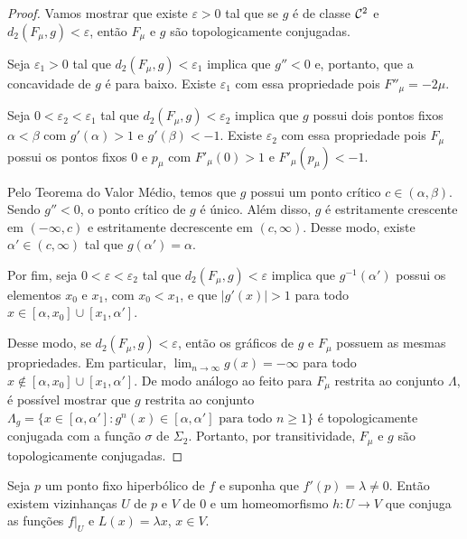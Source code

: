 \begin{proof}
Vamos mostrar que existe $\varepsilon > 0$ tal que se $g$ é de classe $\mathcal{C}^2$ e $d_2(F_\mu, g) < \varepsilon$, então $F_\mu$ e $g$ são topologicamente conjugadas.

Seja $\varepsilon_1 > 0$ tal que $d_2(F_\mu, g) < \varepsilon_1$ implica que $g'' < 0$ e, portanto, que a concavidade de $g$ é para baixo. Existe $\varepsilon_1$ com essa propriedade pois $F''_\mu = -2\mu$. 

Seja $0 < \varepsilon_2 < \varepsilon_1$ tal que $d_2(F_\mu, g) < \varepsilon_2$ implica que $g$ possui dois pontos fixos $\alpha < \beta$ com $g'(\alpha) > 1$ e $g'(\beta) < -1$. Existe $\varepsilon_2$ com essa propriedade pois $F_\mu$ possui os pontos fixos $0$ e $p_\mu$ com $F'_\mu(0) > 1$ e $F'_\mu(p_\mu) < -1$.

Pelo Teorema do Valor Médio, temos que $g$ possui um ponto crítico $c \in (\alpha, \beta)$. Sendo $g'' < 0$, o ponto crítico de $g$ é único. Além disso, $g$ é estritamente crescente em $(-\infty, c)$ e estritamente decrescente em $(c, \infty)$. Desse modo, existe $\alpha' \in (c, \infty)$ tal que $g(\alpha') = \alpha$.

Por fim, seja $0 < \varepsilon < \varepsilon_2$ tal que $d_2(F_\mu, g) < \varepsilon$ implica que $g^{-1}(\alpha')$ possui os elementos $x_0$ e $x_1$, com $x_0 < x_1$, e que $|g'(x)| > 1$ para todo $x \in [\alpha, x_0] \cup [x_1, \alpha']$.

Desse modo, se $d_2(F_\mu, g) < \varepsilon$, então os gráficos de $g$ e $F_\mu$ possuem as mesmas propriedades. Em particular, $\lim_{n \to \infty} g(x) = - \infty$ para todo $x \notin [\alpha, x_0] \cup [x_1, \alpha']$. De modo análogo ao feito para $F_\mu$ restrita ao conjunto $\Lambda$, é possível mostrar que $g$ restrita ao conjunto $\Lambda_g = \{ x \in [\alpha, \alpha'] : g^n(x) \in [\alpha, \alpha'] \textrm{ para todo } n \geq 1\}$ é topologicamente conjugada com a função $\sigma$ de $\Sigma_2$. Portanto, por transitividade, $F_\mu$ e $g$ são topologicamente conjugadas.
\end{proof}

\begin{theorem}[Hartman]
Seja $p$ um ponto fixo hiperbólico de $f$ e suponha que $f'(p) = \lambda \neq 0$. Então existem vizinhanças $U$ de $p$ e $V$ de $0$ e um homeomorfismo $h:U \to V$ que conjuga as funções $f|_U$ e $L(x) = \lambda x$, $x \in V$. 
\end{theorem}













